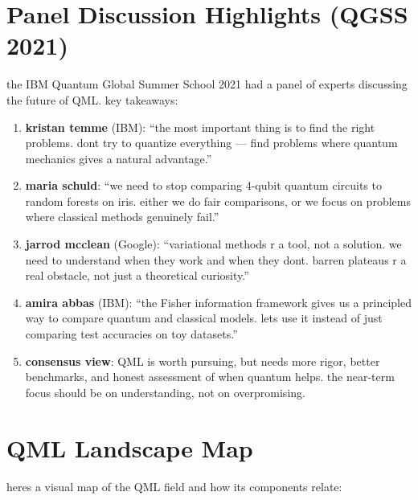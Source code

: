 \documentclass[11pt,a4paper]{article}
\theoremstyle{definition}
\theoremstyle{remark}
\begin{document}
\section{Panel Discussion Highlights (QGSS 2021)}

the IBM Quantum Global Summer School 2021 had a panel of experts discussing the future of QML. key takeaways:

\begin{enumerate}[label=\arabic*.]
    \item \textbf{kristan temme} (IBM): ``the most important thing is to find the right problems. dont try to quantize everything --- find problems where quantum mechanics gives a natural advantage.''

    \item \textbf{maria schuld}: ``we need to stop comparing 4-qubit quantum circuits to random forests on iris. either we do fair comparisons, or we focus on problems where classical methods genuinely fail.''

    \item \textbf{jarrod mcclean} (Google): ``variational methods r a tool, not a solution. we need to understand when they work and when they dont. barren plateaus r a real obstacle, not just a theoretical curiosity.''

    \item \textbf{amira abbas} (IBM): ``the Fisher information framework gives us a principled way to compare quantum and classical models. lets use it instead of just comparing test accuracies on toy datasets.''

    \item \textbf{consensus view}: QML is worth pursuing, but needs more rigor, better benchmarks, and honest assessment of when quantum helps. the near-term focus should be on understanding, not on overpromising.
\end{enumerate}

\section{QML Landscape Map}

heres a visual map of the QML field and how its components relate:
\end{document}
